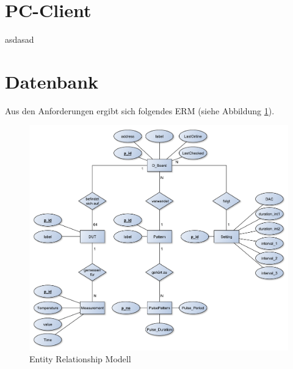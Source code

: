 
\newpage



\newpage
\section{PC-Client}
\label{section_Verwaltung}
asdasad

\newpage



\newpage
\section{Datenbank}
\label{section_EntwurfDatenbank}

Aus den Anforderungen ergibt sich folgendes \ac{ERM} (siehe Abbildung \ref{ERM}). \\

\begin{figure}[H]
\begin{center}
\includegraphics[width=\textwidth]{img/general/ER_Diagramm.pdf}
\caption{Entity Relationship Modell}
\label{ERM}
\end{center}
\end{figure}



